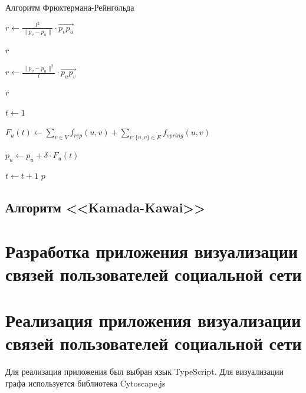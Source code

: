 \documentclass[14pt, russian]{scrartcl}
\begin{document}
\begin{algorithm}
\caption{Алгоритм Фрюхтермана-Рейнгольда}\label{alg:fr_algorithm}
\begin{algorithmic}

  \State $r \gets \frac{l^2}{\|p_v - p_u \|}  \cdot \overrightarrow{p_v p_u}  $
  
  \Return $r$  
  \EndFunction

 
  \State $r \gets \frac{\|p_v - p_u \|^2}{l} \cdot \overrightarrow{p_u p_v}  $
  
  \Return $r$  
  \EndFunction
 

	\State $t \gets 1$

			\State $F_{u}(t) \gets \sum_{v \in V}{f_{rep}(u, v)} + \sum_{v:\{u,v\} \in E}{f_{spring}(u, v)}$
		

		\EndFor
			\State $p_u \gets p_u + \delta \cdot F_u(t)$
		\EndFor
		
		\State $t \gets t + 1$
	\EndWhile
	\Return $p$
	\EndFunction


\end{algorithmic}
\end{algorithm}




\subsection{Алгоритм <<Kamada-Kawai>>}

\section{Разработка приложения визуализации связей пользователей социальной сети}




\section{Реализация приложения визуализации связей пользователей социальной сети}

Для реализация приложения был выбран язык TypeScript. Для визуализации графа используется библиотека Cytoscape.js \cite{Cytoscapejs}
\end{document}
